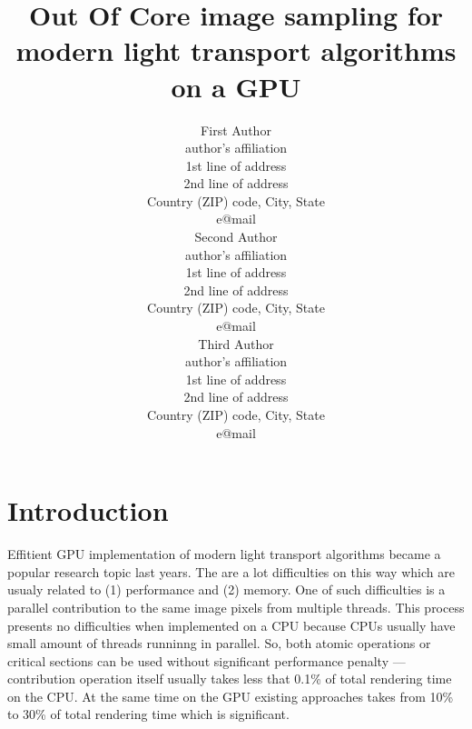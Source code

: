 \documentclass[twoside,twocolumn,10pt]{article}
\title{Out Of Core image sampling for modern light transport algorithms on a GPU}
\author{
\parbox{0.25\textwidth}{\centering
First Author\\[1mm]
author's affiliation\\
1st line of address\\
2nd line of address\\
Country (ZIP) code, City, State\\[1mm]
e@mail
}
\hspace{0.05\textwidth}
\parbox{0.25\textwidth}{\centering
Second Author\\[1mm]
author's affiliation\\
1st line of address\\
2nd line of address\\
Country (ZIP) code, City, State\\[1mm]
e@mail
}
\hspace{0.05\textwidth}
\parbox{0.25\textwidth}{\centering
Third Author\\[1mm]
author's affiliation\\
1st line of address\\
2nd line of address\\
Country (ZIP) code, City, State\\[1mm]
e@mail
}
}
\begin{document}



\section{Introduction}

\copyrightspace

Effitient GPU implementation of modern light transport algorithms became a popular research topic last years. The are a lot difficulties on this way which are usualy related to (1) performance and (2) memory. One of such difficulties is a parallel contribution to the same image pixels from multiple threads. This process presents no difficulties when implemented on a CPU because CPUs usually have small amount of threads runninng in parallel. So, both atomic operations or critical sections can be used without significant performance penalty --- contribution operation itself usually takes less that 0.1\% of total rendering time on the CPU. At the same time on the GPU existing approaches takes from 10\% to 30\% of total rendering time which is significant.
\end{document}
